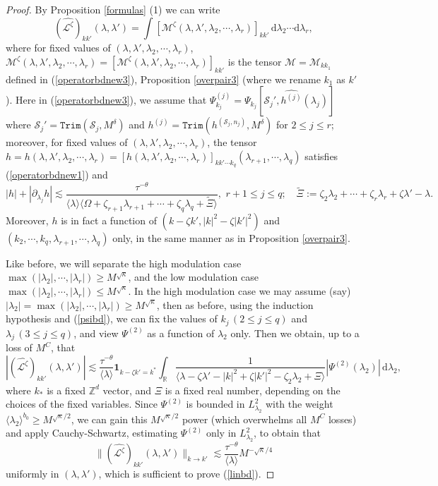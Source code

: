 \documentclass[11 pt,reqno]{amsart}
\theoremstyle{definition}
\theoremstyle{remark}
\numberwithin{equation}{section}
\newcommand{\Sc}{\mathcal{S}}
\newcommand{\Rb}{\mathbb{R}}
\newcommand{\Zb}{\mathbb{Z}}
\newcommand{\Ms}{\mathscr{M}}
\newcommand{\Ls}{\mathscr{L}}
\begin{document}
{\begin{proof}
By Proposition \ref{formulas} (1) we can write
\begin{equation}\label{fourierexpand3}(\widehat{\Ls^{\zeta}})_{kk'}(\lambda,\lambda')=\int[\Ms^{\zeta}(\lambda,\lambda',\lambda_2,\cdots,\lambda_r)]_{kk'}\,\mathrm{d}\lambda_2\cdots\mathrm{d}\lambda_r,
\end{equation} where for fixed values of $(\lambda,\lambda',\lambda_2,\cdots,\lambda_r)$, $\Ms^{\zeta}(\lambda,\lambda',\lambda_2,\cdots,\lambda_r)=[\Ms^{\zeta}(\lambda,\lambda',\lambda_2,\cdots,\lambda_r)]_{kk'}$ is the tensor $\Ms=\Ms_{kk_1}$ defined in (\ref{operatorbdnew3}), Proposition \ref{overpair3} (where we rename $k_1$ as $k'$). Here in (\ref{operatorbdnew3}), we assume that $\Psi_{k_j}^{(j)}=\Psi_{k_j}[\Sc_j',\widehat{h^{(j)}}(\lambda_j)]$ where $\Sc_j'=\mathtt{Trim}(\Sc_j,M^\delta)$ and $h^{(j)}=\mathtt{Trim}(h^{(\Sc_j,n_j)},M^\delta)$ for $2\leq j\leq r$; moreover, for fixed values of $(\lambda,\lambda',\lambda_2,\cdots,\lambda_r)$, the tensor $h=h(\lambda,\lambda',\lambda_2,\cdots,\lambda_r)=[h(\lambda,\lambda',\lambda_2,\cdots,\lambda_r)]_{kk'\cdots k_q}(\lambda_{r+1},\cdots,\lambda_q)$ satisfies (\ref{operatorbdnew1}) and \[|h|+|\partial_{\lambda_j}h|\lesssim \frac{\tau^{-\theta}}{\langle \lambda\rangle\langle\Omega+
\zeta_{r+1}\lambda_{r+1}+\cdots+\zeta_q\lambda_q+\widetilde{\Xi}\rangle},\,\,r+1\leq j\leq q;\quad \widetilde{\Xi}:=\zeta_2\lambda_2+\cdots +\zeta_r\lambda_r+\zeta\lambda'-\lambda.\] Moreover, $h$ is in fact a function of $(k-\zeta k',|k|^2-\zeta|k'|^2)$ and $(k_2,\cdots,k_q,\lambda_{r+1},\cdots,\lambda_q)$ only, in the same manner as in Proposition \ref{overpair3}.

Like before, we will separate the high modulation case $\max(|\lambda_2|,\cdots,|\lambda_r|)\geq M^{\sqrt{\kappa}}$, and the low modulation case $\max(|\lambda_2|,\cdots,|\lambda_r|)\leq M^{\sqrt{\kappa}}$. In the high modulation case we may assume (say) $|\lambda_2|=\max(|\lambda_2|,\cdots,|\lambda_r|)\geq M^{\sqrt{\kappa}}$, then as before, using the induction hypothesis and (\ref{psibd}), we can fix the values of $k_j\,(2\leq j\leq q)$ and $\lambda_j\,(3\leq j\leq q)$, and view $\Psi^{(2)}$ as a function of $\lambda_2$ only. Then we obtain, up to a loss of $M^{C}$, that
\[|(\widehat{\Ls^\zeta})_{kk'}(\lambda,\lambda')|\lesssim\frac{\tau^{-\theta}}{\langle\lambda\rangle}\mathbf{1}_{k-\zeta k'=k^*}\int_\Rb\frac{1}{\langle\lambda-\zeta\lambda'-|k|^2+\zeta|k'|^2-\zeta_2\lambda_2+\Xi\rangle}|\Psi^{(2)}(\lambda_2)|\,\mathrm{d}\lambda_2,\] where $k_*$ is a fixed $\Zb^d$ vector, and $\Xi$ is a fixed real number, depending on the choices of the fixed variables. Since $\Psi^{(2)}$ is bounded in $L_{\lambda_2}^2$ with the weight $\langle\lambda_2\rangle^{b_0}\geq M^{\sqrt{\kappa}/2}$, we can gain this $M^{\sqrt{\kappa}/2}$ power (which overwhelms all $M^{C}$ losses) and apply Cauchy-Schwartz, estimating $\Psi^{(2)}$ only in $L_{\lambda_2}^2$, to obtain that
\[\|(\widehat{\Ls^\zeta})_{kk'}(\lambda,\lambda')\|_{k\to k'}\lesssim\frac{\tau^{-\theta}}{\langle\lambda\rangle} M^{-\sqrt{\kappa}/4}\] uniformly in $(\lambda,\lambda')$, which is sufficient to prove (\ref{linbd}).


\end{proof}}
\end{document}
